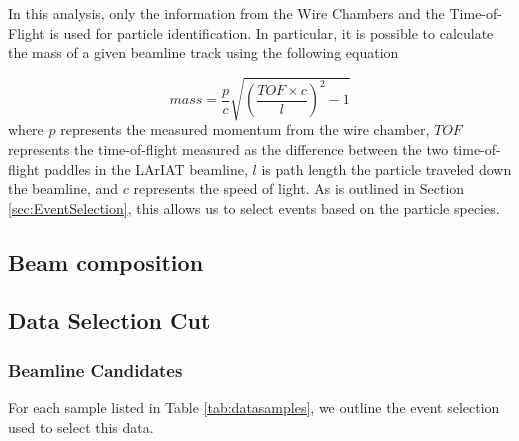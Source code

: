 In this analysis, only the information from the Wire Chambers and the Time-of-Flight is used for particle identification. In particular, it is possible to calculate the mass of a given beamline track using the following equation

\begin{equation}
mass = \frac{p}{c}\sqrt{(\frac{TOF \times c}{l})^2 -1}
\end{equation}
where $p$ represents the measured momentum from the wire chamber, $TOF$ represents the time-of-flight measured as the difference between the two time-of-flight paddles in the LArIAT beamline, $l$ is path length the particle traveled down the beamline, and $c$ represents the speed of light. As is outlined in Section \ref{sec:EventSelection}, this allows us to select events based on the particle species.

\subsection{Beam composition}\label{sec:G4BeamlineMC}



\subsection{Data Selection Cut}\label{sec:DataSelectionCut}
\subsubsection{Beamline Candidates}\label{sec:BeamlineCandidates}

For each sample listed in Table \ref{tab:datasamples}, we outline the event selection used to select this data.

